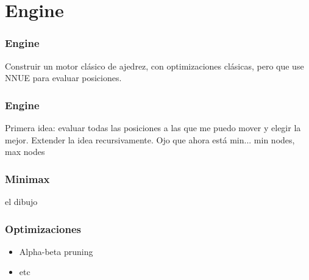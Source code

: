 
\section{Engine}

\begin{frame}
\frametitle{Engine}
Construir un motor clásico de ajedrez, con optimizaciones clásicas, pero que use NNUE para evaluar posiciones.
\end{frame}

\begin{frame}
\frametitle{Engine}
Primera idea: evaluar todas las posiciones a las que me puedo mover y elegir la mejor.
Extender la idea recursivamente. Ojo que ahora está min...
min nodes, max nodes
\end{frame}

\begin{frame}
\frametitle{Minimax}
el dibujo
\end{frame}

\begin{frame}
\frametitle{Optimizaciones}
\begin{itemize}
\item Alpha-beta pruning
\item etc
\end{itemize}
\end{frame}
